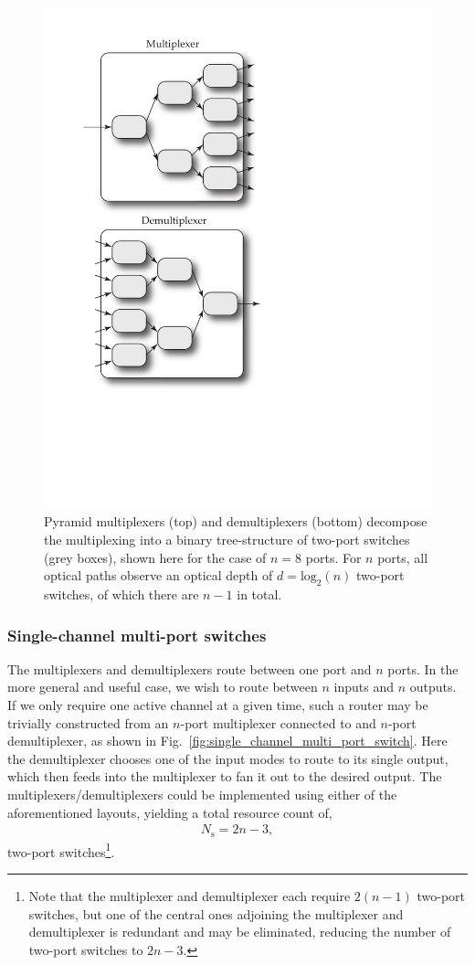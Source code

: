 \documentclass[aps, rmp, twocolumn, amsmath, amssymb, nofootinbib, superscriptaddress, longbibliography, floatfix, table-of-contents, eqsecnum]{revtex4-1}
\begin{document}
\begin{figure}[!htb]
\includegraphics[width=0.7\columnwidth]{pyramid_multiplexer}
\caption{Pyramid multiplexers (top) and demultiplexers (bottom) decompose the multiplexing into a binary tree-structure of two-port switches (grey boxes), shown here for the case of \mbox{$n=8$} ports. For $n$ ports, all optical paths observe an optical depth of \mbox{$d=\mathrm{log}_2(n)$} two-port switches, of which there are \mbox{$n-1$} in total.} \label{fig:pyramid_multiplexer} 
\end{figure}

%
%

\subsubsection{Single-channel multi-port switches} 

The multiplexers and demultiplexers route between one port and $n$ ports. In the more general and useful case, we wish to route between $n$ inputs and $n$ outputs. If we only require one active channel at a given time, such a router may be trivially constructed from an $n$-port multiplexer connected to and $n$-port demultiplexer, as shown in Fig.~\ref{fig:single_channel_multi_port_switch}. Here the demultiplexer chooses one of the input modes to route to its single output, which then feeds into the multiplexer to fan it out to the desired output. The multiplexers/demultiplexers could be implemented using either of the aforementioned layouts, yielding a total resource count of,
\begin{align}
	N_\mathrm{s} = 2n-3,
\end{align}
two-port switches\footnote{Note that the multiplexer and demultiplexer each require \mbox{$2(n-1)$} two-port switches, but one of the central ones adjoining the multiplexer and demultiplexer is redundant and may be eliminated, reducing the number of two-port switches to \mbox{$2n-3$}.}.
\end{document}
